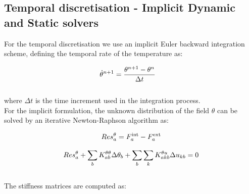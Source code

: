 \documentclass[oneside,11pt,times]{book}
\begin{document}

\subsection{Temporal discretisation - Implicit Dynamic and Static solvers}

For the temporal discretisation we use an implicit Euler backward integration scheme, defining the temporal rate of the temperature as:

\begin{equation}
\begin{aligned}
\centering
\dot{\theta}^{n+1}&=\dfrac{\theta^{n+1}-\theta^{n}}{\Delta t}
\end{aligned}
\label{equationThetatime}
\end{equation}
\\
where $\Delta t$ is the time increment used in the integration process.\\




For the implicit formulation, the unknown distribution of the field $\theta$ can be solved by an iterative Newton-Raphson algorithm as:

\begin{equation}
\begin{aligned}
\centering
Res^{\theta}_{a} = {F}^{\text{int}}_a - {F}^{\text{ext}}_a
\end{aligned}
\label{equationResThetaElem}
\end{equation}

\begin{equation}
\begin{aligned}
\centering
Res^{\theta}_a + \sum_b K_{ab}^{\theta\theta}\Delta\theta_b + \sum_b \sum_k K_{akb}^{\theta u}\Delta{u_{kb}}=0
\end{aligned}
\label{equationN-RTheta}
\end{equation}
\\
The stiffness matrices are computed as:
\end{document}
